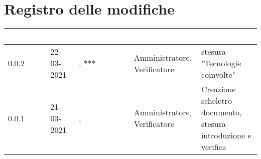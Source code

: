 \section*{Registro delle modifiche}
\setcounter{table}{-1}
{
\renewcommand{\arraystretch}{1.5}
\centering
\begin{longtable}{C{1.7cm} | C{2.2cm} | C{3.2cm} | C{3cm} | C{4.8cm}}
\textcolor{white}{\textbf{Versione}}&
\textcolor{white}{\textbf{Data}}&
\textcolor{white}{\textbf{Nominativo}}&
\textcolor{white}{\textbf{Ruolo}}&
\textcolor{white}{\textbf{Descrizione}}\\	
\endhead

0.0.2 & 22-03-2021 & \SP{}, *** & Amministratore, Verificatore & stesura "Tecnologie coinvolte"\\	
0.0.1 & 21-03-2021 & \ZM{}, \SP{} & Amministratore, Verificatore & Creazione scheletro documento, stesura introduzione e verifica\\
		
\end{longtable}
}